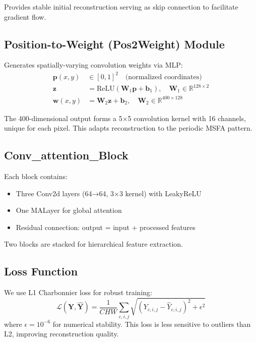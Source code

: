 \documentclass[conference]{IEEEtran}
\begin{document}
Provides stable initial reconstruction serving as skip connection to facilitate gradient flow.

\subsection{Position-to-Weight (Pos2Weight) Module}

Generates spatially-varying convolution weights via MLP:
\begin{equation}
\begin{aligned}
\mathbf{p}(x,y) &\in [0,1]^2 \quad \text{(normalized coordinates)} \\
\mathbf{z} &= \text{ReLU}(\mathbf{W}_1 \mathbf{p} + \mathbf{b}_1), \quad \mathbf{W}_1 \in \mathbb{R}^{128 \times 2} \\
\mathbf{w}(x,y) &= \mathbf{W}_2 \mathbf{z} + \mathbf{b}_2, \quad \mathbf{W}_2 \in \mathbb{R}^{400 \times 128}
\end{aligned}
\end{equation}

The 400-dimensional output forms a 5×5 convolution kernel with 16 channels, unique for each pixel. This adapts reconstruction to the periodic MSFA pattern.

\subsection{Conv\_attention\_Block}

Each block contains:
\begin{itemize}
    \item Three Conv2d layers (64→64, 3×3 kernel) with LeakyReLU
    \item One MALayer for global attention
    \item Residual connection: output = input + processed features
\end{itemize}

Two blocks are stacked for hierarchical feature extraction.

\subsection{Loss Function}

We use L1 Charbonnier loss for robust training:
\begin{equation}
\mathcal{L}(\mathbf{Y}, \hat{\mathbf{Y}}) = \frac{1}{CHW} \sum_{c,i,j} \sqrt{(Y_{c,i,j} - \hat{Y}_{c,i,j})^2 + \epsilon^2}
\end{equation}
where $\epsilon = 10^{-6}$ for numerical stability. This loss is less sensitive to outliers than L2, improving reconstruction quality.
\end{document}
